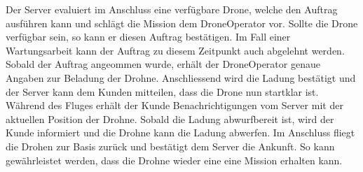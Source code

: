 Der Server evaluiert im Anschluss eine verfügbare Drone, welche den Auftrag ausführen kann und schlägt die Mission dem DroneOperator vor. Sollte die Drone verfügbar sein, so kann er diesen Auftrag bestätigen. Im Fall einer Wartungsarbeit kann der Auftrag zu diesem Zeitpunkt auch abgelehnt werden. Sobald der Auftrag angeommen wurde, erhält der DroneOperator genaue Angaben zur Beladung der Drohne. Anschliessend wird die Ladung bestätigt und der Server kann dem Kunden mitteilen, dass die Drone nun startklar ist. Während des Fluges erhält der Kunde Benachrichtigungen vom Server mit der aktuellen Position der Drohne. Sobald die Ladung abwurfbereit ist, wird der Kunde informiert und die Drohne kann die Ladung abwerfen. Im Anschluss fliegt die Drohen zur Basis zurück und bestätigt dem Server die Ankunft. So kann gewährleistet werden, dass die Drohne wieder eine eine Mission erhalten kann.
%